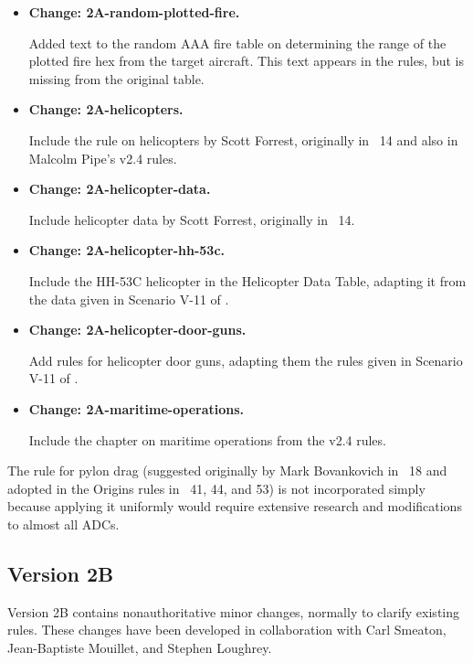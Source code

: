 \documentclass{report}
\newcommand{\changetag}[1]{\textbf{Change: #1.}\par}
\begin{document}
\begin{itemize}
    \item\changetag{2A-random-plotted-fire}

        Added text to the random AAA fire table on determining the range of the plotted fire hex from the target aircraft. This text appears in the rules, but is missing from the original table.

    \item\changetag{2A-helicopters}

        Include the rule on helicopters by Scott Forrest, originally in {\APJ}~14 and also in Malcolm Pipe's v2.4 rules.

    \item\changetag{2A-helicopter-data}

        Include helicopter data by Scott Forrest, originally in {\APJ}~14.

    \item\changetag{2A-helicopter-hh-53c}

        Include the HH-53C helicopter in the Helicopter Data Table, adapting it from the data given in Scenario V-11 of {\TSOH}.

    \item\changetag{2A-helicopter-door-guns}

        Add rules for helicopter door guns, adapting them the rules given in Scenario V-11 of {\TSOH}.

    \item\changetag{2A-maritime-operations}

        Include the chapter on maritime operations from the v2.4 rules.

\end{itemize}

The rule for pylon drag (suggested originally by Mark Bovankovich in {\APJ}~18 and adopted in the Origins rules in {\APJ}~41, 44, and 53) is not incorporated simply because applying it uniformly would require extensive research and modifications to almost all ADCs.

\subsection{Version 2B}

Version 2B contains nonauthoritative minor changes, normally to clarify existing rules. These changes have been developed in collaboration with Carl Smeaton, Jean-Baptiste Mouillet, and Stephen Loughrey.
\end{document}
